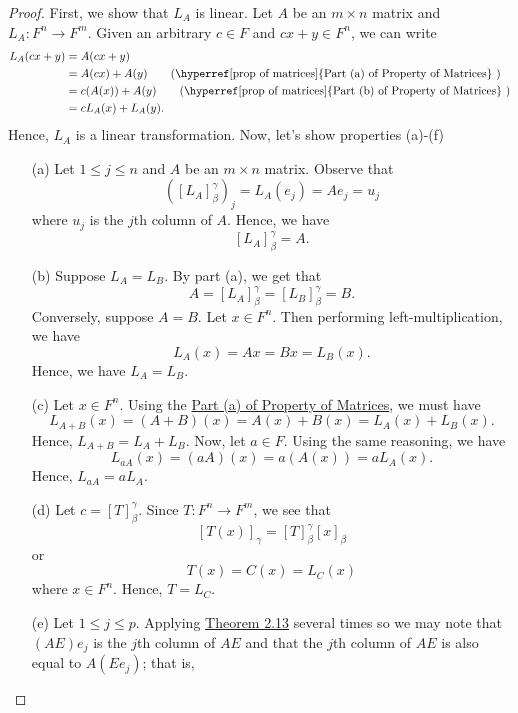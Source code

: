 \begin{proof}
First, we show that \( {L}_{A} \) is linear. Let \( A  \) be an \( m \times n  \) matrix and \( L_{A} : F^{n} \to F^{m} \). Given an arbitrary \( c \in F  \) and \( cx + y \in  F^{n}  \), we can write
   \begin{align*}
       {L}_{A}(cx+y) &= A(cx+y)    \\
                     &= A(cx) + A(y) \tag{{\hyperref[prop of matrices]{Part (a) of Property of Matrices}} } \\
                     &= c(A(x)) + A(y) \tag{{\hyperref[prop of matrices]{Part (b) of Property of Matrices}} } \\
                     &=  c {L}_{A}(x) + {L}_{A}(y). 
   \end{align*} 
   Hence, \( {L}_{A} \) is a linear transformation. Now, let's show properties (a)-(f) 
   \begin{enumerate}
       \item[(a)] Let \( 1 \leq j \leq n  \) and \( A  \) be an \( m \times n  \) matrix. Observe that 
           \[  ([{L}_{A}]_{\beta}^{\gamma} )_{j} = {L}_{A}({e}_{j}) = A {e}_{j} = {u}_{j}  \]
           where \( {u}_{j}  \) is the \( j \)th column of \( A  \). Hence, we have 
           \[ [{L}_{A}]_{\beta}^{\gamma} = A.    \]
        \item[(b)] Suppose \( {L}_{A} = {L}_{B} \). By part (a), we get that
            \[  A = [{L}_{A}]_{\beta}^{\gamma} = [{L}_{B}]_{\beta}^{\gamma}  = B. \]
            Conversely, suppose \( A = B  \). Let \( x \in F^{n} \). Then performing left-multiplication, we have
            \[  {L}_{A}(x) =  Ax = Bx = {L}_{B}(x).  \]
            Hence, we have \( {L}_{A} = {L}_{B} \).
        \item[(c)] Let \( x \in F^{n} \). Using the {\hyperref[prop of matrices]{Part (a) of Property of Matrices}}, we must have
            \[  {L}_{A+B}(x) = (A+B)(x) = A(x) + B(x) = {L}_{A}(x) + {L}_{B}(x). \]
            Hence, \( {L}_{A+B} = {L}_{A} + {L}_{B} \). Now, let \( a \in F  \). Using the same reasoning, we have  
            \[  {L}_{aA}(x) = (aA)(x) = a (A(x)) = a {L}_{A}(x).  \]
            Hence, \( {L}_{aA} = a{L}_{A}. \)
        \item[(d)] Let \( c = [T]_{\beta}^{\gamma}  \). Since \( T: F^{n} \to F^{m} \), we see that 
            \[  [T(x)]_{\gamma} = [T]_{\beta}^{\gamma} [x]_{\beta}      \]
            or 
            \[  T(x) = C(x) = {L}_{C}(x) \]
            where \( x \in F^{n} \). Hence, \( T = {L}_{C} \).
        \item[(e)] Let \( 1 \leq j \leq  p  \). Applying {\hyperref[Theorem 2.13]{Theorem 2.13}} several times so we may note that \( (AE){e}_{j}  \) is the \( j \)th column of \( AE  \) and that the \( j \)th column of \( AE \) is also equal to \( A(E {e}_{j}) \); that is, 

\end{enumerate}
\end{proof}
